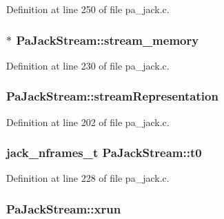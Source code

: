 Definition at line 250 of file pa\+\_\+jack.\+c.

\subsubsection[{\texorpdfstring{stream\+\_\+memory}{stream_memory}}]{$\ast$ Pa\+Jack\+Stream\+::stream\+\_\+memory}\hypertarget{struct_pa_jack_stream_a06ac71c5889609c10f209e21a85fba0d}{}\label{struct_pa_jack_stream_a06ac71c5889609c10f209e21a85fba0d}


Definition at line 230 of file pa\+\_\+jack.\+c.

\subsubsection[{\texorpdfstring{stream\+Representation}{streamRepresentation}}]{ Pa\+Jack\+Stream\+::stream\+Representation}\hypertarget{struct_pa_jack_stream_ae04c2e7f23e9858dbcc3ec7c8f44a810}{}\label{struct_pa_jack_stream_ae04c2e7f23e9858dbcc3ec7c8f44a810}


Definition at line 202 of file pa\+\_\+jack.\+c.

\subsubsection[{\texorpdfstring{t0}{t0}}]{\setlength{\rightskip}{0pt plus 5cm}jack\+\_\+nframes\+\_\+t Pa\+Jack\+Stream\+::t0}\hypertarget{struct_pa_jack_stream_ab3acbd1df33dfc6265fa9719c81b549c}{}\label{struct_pa_jack_stream_ab3acbd1df33dfc6265fa9719c81b549c}


Definition at line 228 of file pa\+\_\+jack.\+c.

\subsubsection[{\texorpdfstring{xrun}{xrun}}]{ Pa\+Jack\+Stream\+::xrun}\hypertarget{struct_pa_jack_stream_ac47c25349767b6d5eaee70792f9dca5f}{}\label{struct_pa_jack_stream_ac47c25349767b6d5eaee70792f9dca5f}


